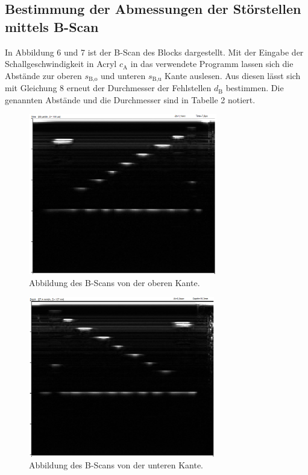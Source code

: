 \subsection{Bestimmung der Abmessungen der Störstellen mittels B-Scan}
In Abbildung 6 und 7 ist der B-Scan des Blocks dargestellt. Mit der Eingabe der Schallgeschwindigkeit in Acryl
$c_\text{A}$ in das verwendete Programm lassen sich die Abstände zur oberen $s_\text{B,o}$ und
unteren $s_\text{B,u}$ Kante auslesen. Aus diesen lässt sich
mit Gleichung 8 erneut der Durchmesser der Fehlstellen $d_\text{B}$ bestimmen. Die genannten Abstände und die
Durchmesser sind in Tabelle 2 notiert.

\begin{figure}[H]
  \centering
  \includegraphics[height=7cm]{b-time-1.png}
  \caption{Abbildung des B-Scans von der oberen Kante.}
  \label{fig:acryl}
\end{figure}

\begin{figure}[H]
  \centering
  \includegraphics[height=7cm]{b-time-2.PNG}
  \caption{Abbildung des B-Scans von der unteren Kante.}
  \label{fig:acryl}
\end{figure}

